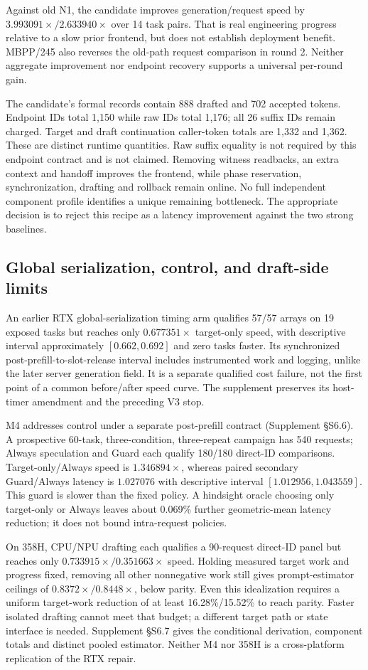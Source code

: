 

Against old N1, the candidate improves generation/request speed by $3.993091\times/2.633940\times$ over 14 task pairs. That is real engineering progress relative to a slow prior frontend, but does not establish deployment benefit. MBPP/245 also reverses the old-path request comparison in round 2. Neither aggregate improvement nor endpoint recovery supports a universal per-round gain.

The candidate's formal records contain 888 drafted and 702 accepted tokens. Endpoint IDs total 1,150 while raw IDs total 1,176; all 26 suffix IDs remain charged. Target and draft continuation caller-token totals are 1,332 and 1,362. These are distinct runtime quantities. Raw suffix equality is not required by this endpoint contract and is not claimed. Removing witness readbacks, an extra context and handoff improves the frontend, while phase reservation, synchronization, drafting and rollback remain online. No full independent component profile identifies a unique remaining bottleneck. The appropriate decision is to reject this recipe as a latency improvement against the two strong baselines.

\subsection{Global serialization, control, and draft-side limits}
An earlier RTX global-serialization timing arm qualifies 57/57 arrays on 19 exposed tasks but reaches only $0.677351\times$ target-only speed, with descriptive interval approximately $[0.662,0.692]$ and zero tasks faster. Its synchronized post-prefill-to-slot-release interval includes instrumented work and logging, unlike the later server generation field. It is a separate qualified cost failure, not the first point of a common before/after speed curve. The supplement preserves its host-timer amendment and the preceding V3 stop.

M4 addresses control under a separate post-prefill contract (Supplement \S S6.6). A prospective 60-task, three-condition, three-repeat campaign has 540 requests; Always speculation and Guard each qualify 180/180 direct-ID comparisons. Target-only/Always speed is $1.346894\times$, whereas paired secondary Guard/Always latency is $1.027076$ with descriptive interval $[1.012956,1.043559]$. This guard is slower than the fixed policy. A hindsight oracle choosing only target-only or Always leaves about 0.069\% further geometric-mean latency reduction; it does not bound intra-request policies.

On 358H, CPU/NPU drafting each qualifies a 90-request direct-ID panel but reaches only $0.733915\times/0.351663\times$ speed. Holding measured target work and progress fixed, removing all other nonnegative work still gives prompt-estimator ceilings of $0.8372\times/0.8448\times$, below parity. Even this idealization requires a uniform target-work reduction of at least 16.28\%/15.52\% to reach parity. Faster isolated drafting cannot meet that budget; a different target path or state interface is needed. Supplement \S S6.7 gives the conditional derivation, component totals and distinct pooled estimator. Neither M4 nor 358H is a cross-platform replication of the RTX repair.
\FloatBarrier
